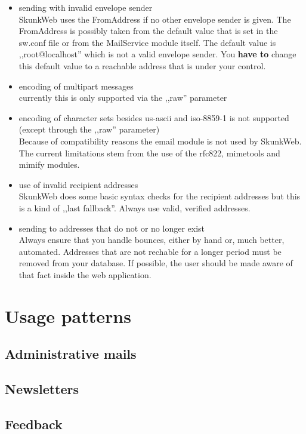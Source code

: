 \documentclass{article}
\begin{document}
\begin{itemize}
  \item sending with invalid envelope sender\\
        SkunkWeb uses the FromAddress if no other envelope sender
	is given. The FromAddress is possibly taken from the default
	value that is set in the sw.conf file or from the MailService module
	itself. The default value is ,,root@localhost'' which is not
	a valid envelope sender. You \textbf{have to} change this
	default value to a reachable address that is under your control.
  \item encoding of multipart messages\\
        currently this is only supported via the ,,raw'' parameter
  \item encoding of character sets besides us-ascii and iso-8859-1
        is not supported (except through the ,,raw'' parameter)\\
        Because of compatibility reasons the email module is not
	used by SkunkWeb. The current limitations stem from the use
	of the rfc822, mimetools and mimify modules.
  \item use of invalid recipient addresses\\
        SkunkWeb does some basic syntax checks for the recipient addresses
	but this is a kind of ,,last fallback''. Always use valid,
	verified addresses.
  \item sending to addresses that do not or no longer exist\\
        Always ensure that you handle bounces, either by hand or, much
	better, automated. Addresses that are not rechable for a longer
	period must be removed from your database. If possible, the
	user should be made aware of that fact inside the web application.
\end{itemize}


\section{Usage patterns}
\subsection{Administrative mails}
\subsection{Newsletters}
\subsection{Feedback}
\end{document}

